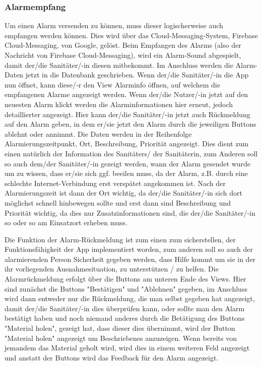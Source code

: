    \subsubsection{Alarmempfang}
    Um einen Alarm versenden zu können, muss dieser logischerweise auch empfangen werden können. 
    Dies wird über das Cloud-Messaging-System, Firebase Cloud-Messaging, von Google, gelöst.
    Beim Empfangen des Alarms (also der Nachricht von Firebase Cloud-Messaging), wird ein Alarm-Sound abgespielt,
    damit der/die Sanitäter/-in diesen mitbekommt. Im Anschluss werden die Alarm-Daten jetzt in die Datenbank geschrieben.
    Wenn der/die Sanitäter/-in die App nun öffnet, kann diese/-r den View \glqq Alarminfo \grqq öffnen, auf welchem die empfangenen
    Alarme angezeigt werden. Wenn der/die Nutzer/-in jetzt auf den neuesten Alarm klickt werden die Alarminformationen hier erneut, jedoch detaillierter angezeigt.
    Hier kann der/die Sanitäter/-in jetzt auch Rückmeldung auf den Alarm geben, in dem er/sie jetzt den Alarm durch die jeweiligen Buttons ablehnt oder annimmt.
    Die Daten werden in der Reihenfolge Alarmierungszeitpunkt, Ort, Beschreibung, Priorität angezeigt. Dies dient zum einen natürlich der Information des Sanitäters/ der Sanitäterin, 
    zum Anderen soll so auch dem/der Sanitäter/-in gezeigt werden, wann der Alarm gesendet wurde um zu wissen, dass er/sie sich ggf. beeilen muss, da der Alarm, z.B. durch eine schlechte 
    Internet-Verbindung erst verspätet angekommen ist. Nach der Alarmierungszeit ist dann der Ort wichtig, da der/die Sanitäter/-in sich dort möglichst schnell hinbewegen sollte und erst dann sind 
    Beschreibung und Priorität wichtig, da dies nur Zusatzinformationen sind, die der/die Sanitäter/-in so oder so am Einsatzort erheben muss.

    \noindent Die Funktion der Alarm-Rückmeldung ist zum einen zum sicherstellen, der Funktionsfähigkeit der App implementiert worden, 
    zum anderen soll so auch der alarmierenden Person Sicherheit gegeben werden, dass Hilfe kommt um sie in der ihr vorliegenden Ausnahmesituation,
    zu unterstützen / zu helfen.
    Die Alarmrückmeldung erfolgt über die Buttons am unteren Ende des Views. Hier sind zunächst die Buttons "Bestätigen" und "Ablehnen" gegeben, im Anschluss wird dann entweder nur die Rückmeldung, die man selbst
    gegeben hat angezeigt, damit der/die Sanitäter/-in dies überprüfen kann, oder sollte man den Alarm bestätigt haben und noch niemand anderes durch die Betätigung des Buttons "Material holen", gezeigt hat, dass dieser dies übernimmt, 
    wird der Button "Material holen" angezeigt um Beschriebenes anzuzeigen.
    Wenn bereits von jemandem das Material geholt wird, wird dies in einem weiteren Feld angezeigt und anstatt der Buttons wird das Feedback für den Alarm angezeigt.

